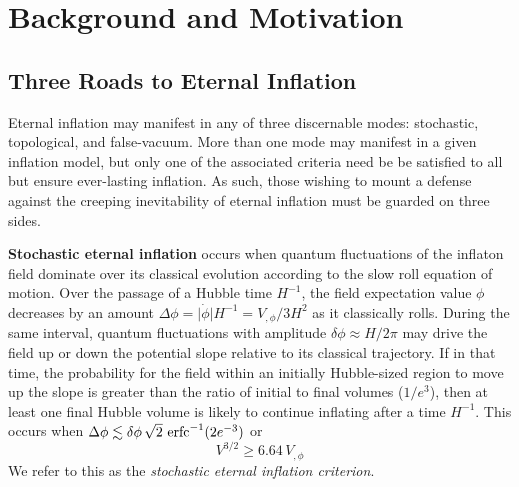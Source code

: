 \section{Background and Motivation}

\subsection{Three Roads to Eternal Inflation}


Eternal inflation may manifest in any of three discernable modes: stochastic, topological, and false-vacuum.  More than one mode may manifest in a given inflation model, but only one of the associated criteria need be be satisfied to all but ensure ever-lasting inflation.  As such, those wishing to mount a defense against the creeping inevitability of eternal inflation must be guarded on three sides.

\textbf{Stochastic eternal inflation} occurs when quantum fluctuations of the inflaton field dominate over its classical evolution according to the slow roll equation of motion.
Over the passage of a Hubble time $H^{-1}$, the field expectation value $\phi$ decreases by an amount $\Delta \phi = \lvert\dot\phi\rvert H^{-1} = V_{,\phi} / 3H^2 $ as it classically rolls.  During the same interval, quantum fluctuations with amplitude $\delta\phi \approx H/2\pi$ may drive the field up or down the potential slope relative to its classical trajectory.  
If in that time, the probability for the field within an initially Hubble-sized region to move up the slope is greater than the ratio of initial to final volumes ($1/e^3$), then at least one final Hubble volume is likely to continue inflating after a time $H^{-1}$.  This occurs when $ \Delta \phi \lesssim \delta \phi \, \sqrt{2} \, \operatorname{erfc}^{-1} (2e^{-3}) $ or
\begin{equation}
V^{3/2} \geq 6.64 \, V_{,\phi} \label{seic}
\end{equation}  
We refer to this as the {\it stochastic eternal inflation criterion}.


